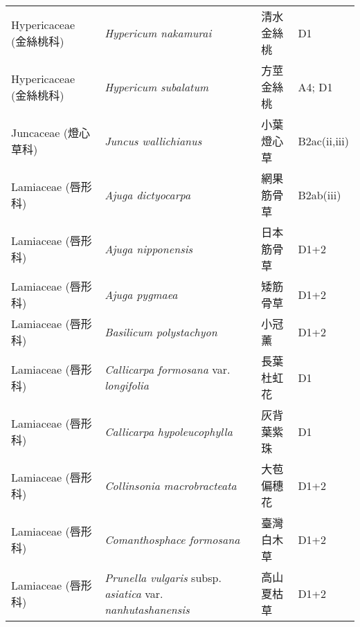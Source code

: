 \begin{longtable}{p{3cm}p{5cm}p{3cm}p{4cm}}
    Hypericaceae (金絲桃科) & \textit{Hypericum nakamurai}  & 清水金絲桃 & D1 \index{Hypericum@\textit{Hypericum}!nakamurai@\textit{nakamurai}}  \index{清水金絲桃} \\
    Hypericaceae (金絲桃科) & \textit{Hypericum subalatum}  & 方莖金絲桃 & A4; D1 \index{Hypericum@\textit{Hypericum}!subalatum@\textit{subalatum}}  \index{方莖金絲桃} \\
    Juncaceae (燈心草科) & \textit{Juncus wallichianus}  & 小葉燈心草 & B2ac(ii,iii) \index{Juncus@\textit{Juncus}!wallichianus@\textit{wallichianus}}  \index{小葉燈心草} \\
    Lamiaceae (唇形科) & \textit{Ajuga dictyocarpa}  & 網果筋骨草 & B2ab(iii) \index{Ajuga@\textit{Ajuga}!dictyocarpa@\textit{dictyocarpa}}  \index{網果筋骨草} \\
    Lamiaceae (唇形科) & \textit{Ajuga nipponensis}  & 日本筋骨草 & D1+2 \index{Ajuga@\textit{Ajuga}!nipponensis@\textit{nipponensis}}  \index{日本筋骨草} \\
    Lamiaceae (唇形科) & \textit{Ajuga pygmaea}  & 矮筋骨草 & D1+2 \index{Ajuga@\textit{Ajuga}!pygmaea@\textit{pygmaea}}  \index{矮筋骨草} \\
    Lamiaceae (唇形科) & \textit{Basilicum polystachyon}  & 小冠薰 & D1+2 \index{Basilicum@\textit{Basilicum}!polystachyon@\textit{polystachyon}}  \index{小冠薰} \\
    Lamiaceae (唇形科) & \textit{Callicarpa formosana} var. \textit{longifolia}  & 長葉杜虹花 & D1 \index{Callicarpa@\textit{Callicarpa}!formosana@\textit{formosana}!var. longifolia@var. \textit{longifolia}}  \index{長葉杜虹花} \\
    Lamiaceae (唇形科) & \textit{Callicarpa hypoleucophylla}  & 灰背葉紫珠 & D1 \index{Callicarpa@\textit{Callicarpa}!hypoleucophylla@\textit{hypoleucophylla}}  \index{灰背葉紫珠} \\
    Lamiaceae (唇形科) & \textit{Collinsonia macrobracteata}  & 大苞偏穗花 & D1+2 \index{Collinsonia@\textit{Collinsonia}!macrobracteata@\textit{macrobracteata}}  \index{大苞偏穗花} \\
    Lamiaceae (唇形科) & \textit{Comanthosphace formosana}  & 臺灣白木草 & D1+2 \index{Comanthosphace@\textit{Comanthosphace}!formosana@\textit{formosana}}  \index{臺灣白木草} \\
    Lamiaceae (唇形科) & \textit{Prunella vulgaris} subsp. \textit{asiatica} var. \textit{nanhutashanensis}  & 高山夏枯草 & D1+2 \index{Prunella@\textit{Prunella}!vulgaris@\textit{vulgaris}!subsp. asiatica@subsp. \textit{asiatica}!var. nanhutashanensis@var. \textit{nanhutashanensis}}  \index{高山夏枯草} \\

\end{longtable}
